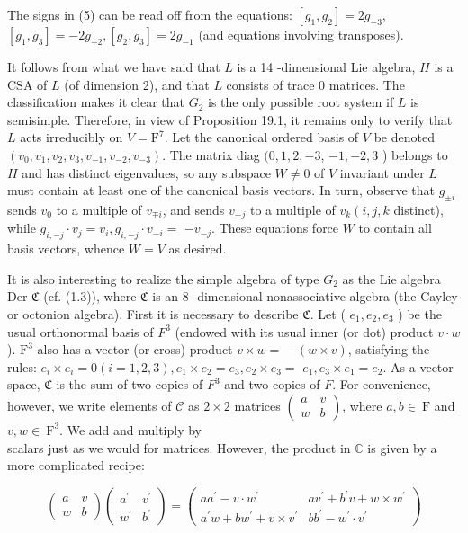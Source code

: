 \documentclass[10pt]{article}
\begin{document}
The signs in (5) can be read off from the equations: $\left[g_{1}, g_{2}\right]=2 g_{-3}$, $\left[g_{1}, g_{3}\right]=-2 g_{-2},\left[g_{2}, g_{3}\right]=2 g_{-1}$ (and equations involving transposes).

It follows from what we have said that $L$ is a 14 -dimensional Lie algebra, $H$ is a CSA of $L$ (of dimension 2), and that $L$ consists of trace 0 matrices. The classification makes it clear that $G_{2}$ is the only possible root system if $L$ is semisimple. Therefore, in view of Proposition 19.1, it remains only to verify that $L$ acts irreducibly on $V=\mathrm{F}^{7}$. Let the canonical ordered basis of $V$ be denoted $\left(v_{0}, v_{1}, v_{2}, v_{3}, v_{-1}, v_{-2}, v_{-3}\right)$. The matrix diag $(0,1,2,-3$, $-1,-2,3$ ) belongs to $H$ and has distinct eigenvalues, so any subspace $W \neq 0$ of $V$ invariant under $L$ must contain at least one of the canonical basis vectors. In turn, observe that $g_{ \pm i}$ sends $v_{0}$ to a multiple of $v_{\mp i}$, and sends $v_{ \pm j}$ to a multiple of $v_{k}\left(i, j, k\right.$ distinct), while $g_{i,-j} \cdot v_{j}=v_{i}, g_{i,-j} \cdot v_{-i}=$ $-v_{-j}$. These equations force $W$ to contain all basis vectors, whence $W=V$ as desired.

It is also interesting to realize the simple algebra of type $G_{2}$ as the Lie algebra Der $\mathfrak{C}$ (cf. (1.3)), where $\mathfrak{C}$ is an 8 -dimensional nonassociative algebra (the Cayley or octonion algebra). First it is necessary to describe $\mathfrak{C}$. Let ( $e_{1}, e_{2}, e_{3}$ ) be the usual orthonormal basis of $F^{3}$ (endowed with its usual inner (or dot) product $v \cdot w$ ). $\mathrm{F}^{3}$ also has a vector (or cross) product $v \times w=$ $-(w \times v)$, satisfying the rules: $e_{i} \times e_{i}=0(i=1,2,3), e_{1} \times e_{2}=e_{3}, e_{2} \times e_{3}=$ $e_{1}, e_{3} \times e_{1}=e_{2}$. As a vector space, $\mathfrak{C}$ is the sum of two copies of $F^{3}$ and two copies of $F$. For convenience, however, we write elements of $\mathcal{C}$ as $2 \times 2$ matrices $\left(\begin{array}{ll}a & v \\ w & b\end{array}\right)$, where $a, b \in \mathrm{~F}$ and $v, w \in \mathrm{~F}^{3}$. We add and multiply by\\
scalars just as we would for matrices. However, the product in $\mathbb{C}$ is given by a more complicated recipe:

$$
\left(\begin{array}{ll}
a & v \\
w & b
\end{array}\right)\left(\begin{array}{ll}
a^{\prime} & v^{\prime} \\
w^{\prime} & b^{\prime}
\end{array}\right)=\left(\begin{array}{ll}
a a^{\prime}-v \cdot w^{\prime} & a v^{\prime}+b^{\prime} v+w \times w^{\prime} \\
a^{\prime} w+b w^{\prime}+v \times v^{\prime} & b b^{\prime}-w^{\prime} \cdot v^{\prime}
\end{array}\right)
$$
\end{document}

